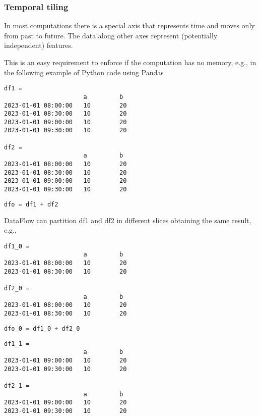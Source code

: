 \documentclass[11pt, reqno]{amsart}
\theoremstyle{definition}
\theoremstyle{remark}
\begin{document}
  \subsubsection{Temporal tiling}

  In most computations there is a special axis that represents time and moves
  only from past to future. The data along other axes represent (potentially
  independent) features.

  This is an easy requirement to enforce if the computation has no memory, e.g.,
  in the following example of Python code using Pandas

  \begin{verbatim}
df1 =
                      a         b
2023-01-01 08:00:00   10        20
2023-01-01 08:30:00   10        20
2023-01-01 09:00:00   10        20
2023-01-01 09:30:00   10        20

df2 =
                      a         b
2023-01-01 08:00:00   10        20
2023-01-01 08:30:00   10        20
2023-01-01 09:00:00   10        20
2023-01-01 09:30:00   10        20
\end{verbatim}

  \begin{lstlisting}[language=Python]
dfo = df1 + df2
\end{lstlisting}

  DataFlow can partition df1 and df2 in different slices obtaining the same result,
  e.g.,

  \begin{verbatim}
df1_0 =
                      a         b
2023-01-01 08:00:00   10        20
2023-01-01 08:30:00   10        20

df2_0 =
                      a         b
2023-01-01 08:00:00   10        20
2023-01-01 08:30:00   10        20
\end{verbatim}

  \begin{lstlisting}[language=Python]
dfo_0 = df1_0 + df2_0
\end{lstlisting}

  \begin{verbatim}
df1_1 =
                      a         b
2023-01-01 09:00:00   10        20
2023-01-01 09:30:00   10        20

df2_1 =
                      a         b
2023-01-01 09:00:00   10        20
2023-01-01 09:30:00   10        20
\end{verbatim}
\end{document}
